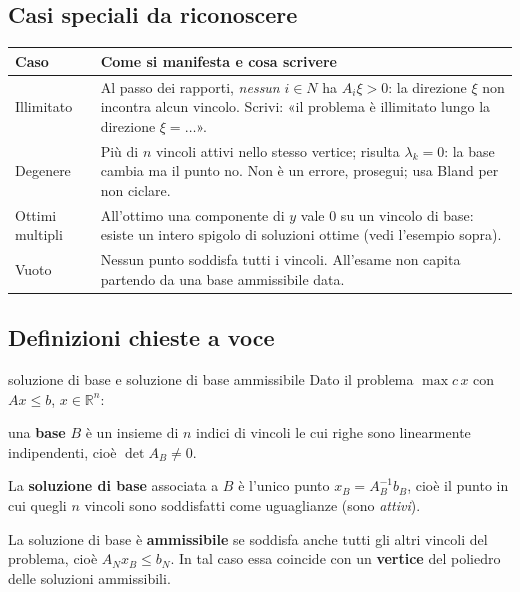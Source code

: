 \documentclass[11pt,a4paper]{article}
\begin{document}
\subsection{Casi speciali da riconoscere}

\begin{center}
\begin{tabular}{@{}p{3.2cm} p{11.3cm}@{}}
\toprule
\textbf{Caso} & \textbf{Come si manifesta e cosa scrivere}\\
\midrule
Illimitato & Al passo dei rapporti, \emph{nessun} $i \in N$ ha $A_i\xi > 0$: la direzione $\xi$
non incontra alcun vincolo. Scrivi: «il problema è illimitato lungo la direzione $\xi = \dots$».\\
\addlinespace
Degenere & Più di $n$ vincoli attivi nello stesso vertice; risulta $\lambda_k = 0$: la base
cambia ma il punto no. Non è un errore, prosegui; usa Bland per non ciclare.\\
\addlinespace
Ottimi multipli & All'ottimo una componente di $y$ vale 0 su un vincolo di base: esiste
un intero spigolo di soluzioni ottime (vedi l'esempio sopra).\\
\addlinespace
Vuoto & Nessun punto soddisfa tutti i vincoli. All'esame non capita partendo da una base
ammissibile data.\\
\bottomrule
\end{tabular}
\end{center}

\subsection{Definizioni chieste a voce}

\begin{teo}{soluzione di base e soluzione di base ammissibile}
Dato il problema $\max c\,x$ con $Ax \le b$, $x \in \mathbb{R}^n$:

una \textbf{base} $B$ è un insieme di $n$ indici di vincoli le cui righe sono linearmente
indipendenti, cioè $\det A_B \ne 0$.

La \textbf{soluzione di base} associata a $B$ è l'unico punto $x_B = A_B^{-1} b_B$,
cioè il punto in cui quegli $n$ vincoli sono soddisfatti come uguaglianze (sono \emph{attivi}).

La soluzione di base è \textbf{ammissibile} se soddisfa anche tutti gli altri vincoli del
problema, cioè $A_N x_B \le b_N$. In tal caso essa coincide con un \textbf{vertice} del poliedro
delle soluzioni ammissibili.
\end{teo}
\end{document}
